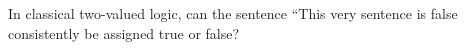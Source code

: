 In classical two-valued logic, can the sentence ``This very sentence is false consistently be assigned true or false?
